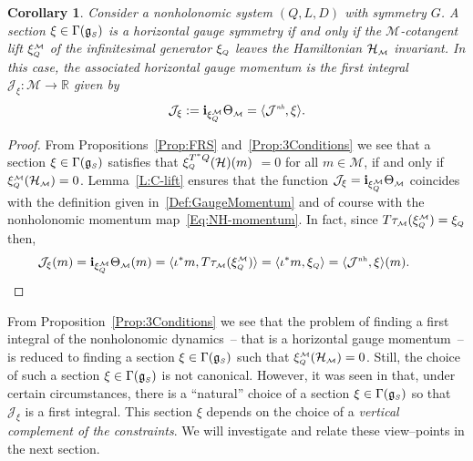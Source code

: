 \documentclass[pdftex]{sigma}
\numberwithin{equation}{section}
\newtheorem{Corollary}[Theorem]{Corollary}
\def\M{\mathcal{M}}
\def\J{\mathcal{J}}
\def\Ham{\mathcal{H}}
\def\R{\mathbb{R}}
\def\g{\mathfrak{g}}
\def\nh{{\mbox{\tiny{nh}}}}
\def\subM{{\mbox{\tiny{$\M$}}}}
\def\subSS{{\mbox{\tiny{$S$}}}}
\def\subQQ{{\mbox{\tiny{$Q$}}}}
\begin{document}
\begin{Corollary} \label{C:MLift}
  Consider a nonholonomic system $(Q,L,D)$ with symmetry $G$.
  A section $\xi\in\Gamma(\g_\subSS)$ is a {\it horizontal gauge symmetry} if and only if
  the $\M$-cotangent lift $\xi_{\mbox{\tiny{$Q$}}}^{\subM}$ of the infinitesimal generator
  $\xi_{\mbox{\tiny{$Q$}}}$ leaves the Hamiltonian $\Ham_\subM$ invariant. In this case, the associated horizontal gauge momentum is the first integral ${\mathcal J}_\xi\colon \M\to \R$ given by
  \begin{gather*}%
  {\mathcal J}_\xi:=
  {\bf i}_{\xi^\subM_{\mbox{\tiny{$Q$}}}}  \Theta_\subM = \langle \J^{\emph\nh}, \xi\rangle .
  \end{gather*}
\end{Corollary}

\begin{proof}
From Propositions~\ref{Prop:FRS} and~\ref{Prop:3Conditions} we see that a section $\xi\in\Gamma(\g_\subSS)$ satisf\/ies that  $\xi_\subQQ^{T^*Q} (\Ham) (m)$ $ = 0$ for all $m\in\M$, if and only if $\xi_\subQQ^\subM (\Ham_\subM) = 0$. Lemma~\ref{L:C-lift} ensures that the function $\mathcal{J}_\xi = {\bf i}_{\xi^\subM_{\mbox{\tiny{$Q$}}}}  \Theta_\subM$ coincides with the def\/inition given
 in~\eqref{Def:GaugeMomentum} and of course with the nonholonomic momentum map~\eqref{Eq:NH-momentum}. In fact, since $T\tau_\subM ( \xi_\subQQ^\subM ) = \xi_\subQQ$ then,
 \begin{gather*}
 \J_\xi(m) = {\bf i}_{\xi^\subM_{\mbox{\tiny{$Q$}}}}
 \Theta_\subM (m) = \langle \iota^*m, T\tau_\subM ( \xi_\subQQ^\subM ) \rangle =  \langle \iota^*m,
  \xi_\subQQ \rangle =  \langle {\mathcal J}^\nh , \xi \rangle (m).\tag*{\qed}
 \end{gather*}
 \renewcommand{\qed}{}
\end{proof}

From Proposition~\ref{Prop:3Conditions} we see that the problem of f\/inding a f\/irst integral of the nonholonomic dynamics~-- that is a horizontal gauge momentum~-- is reduced to  f\/inding a section $\xi \in \Gamma(\g_\subSS)$ such that $\xi^\subM_\subQQ(\Ham_\subM) = 0$. Still, the choice of such a section $\xi \in \Gamma(\g_\subSS)$ is not canonical.
However, it was seen in \cite{Paula} that, under certain circumstances, there is a ``natural'' choice of a section
$\xi \in \Gamma(\mathfrak{g}_{\subSS})$ so that $\J_\xi$ is a f\/irst integral.
This section $\xi$ depends on the choice of a {\it vertical complement of the constraints}.
We will investigate and relate these view--points in the next section.
\end{document}
